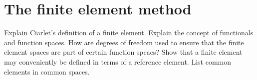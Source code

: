 \section{The finite element method}
Explain Ciarlet's definition of a finite element.
Explain the concept of functionals and function spaces.
How are degrees of freedom used to ensure that the finite element spaces are part of certain function spcaes?
Show that a finite element may conveniently be defined in terms of a reference element.
List common elements in common spaces.
